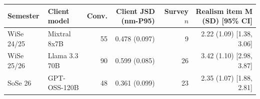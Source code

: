 \begin{tabular}{llrrrr}
\toprule
Semester & Client model & Conv. & Client JSD (nm-P95) & Survey $n$ & Realism item M (SD) [95\% CI] \\
\midrule
WiSe 24/25 & Mixtral 8x7B & 55 & 0.478 (0.097) & 9 & 2.22 (1.09) [1.38, 3.06] \\
WiSe 25/26 & Llama 3.3 70B & 90 & 0.599 (0.085) & 26 & 3.42 (1.10) [2.98, 3.87] \\
SoSe 26 & GPT-OSS-120B & 48 & 0.361 (0.099) & 23 & 2.35 (1.07) [1.88, 2.81] \\
\bottomrule
\end{tabular}
